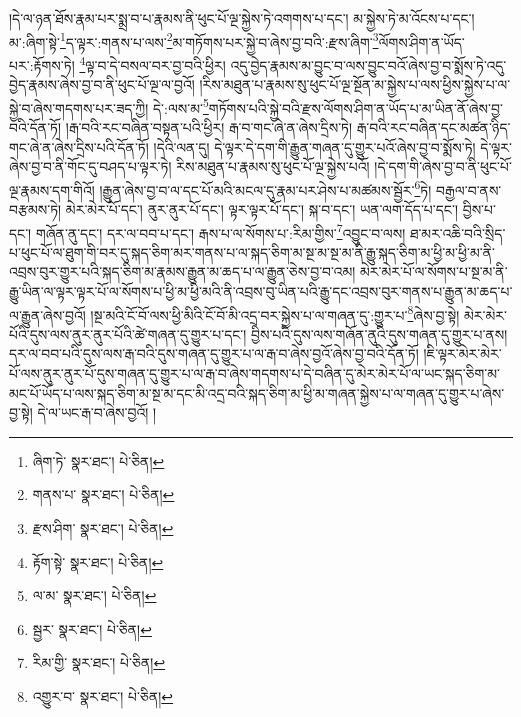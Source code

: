 །དེ་ལ་ཉན་ཐོས་རྣམ་པར་སྨྲ་བ་པ་རྣམས་ནི་ཕུང་པོ་ལྔ་སྐྱེས་ཏེ་འགགས་པ་དང་། མ་སྐྱེས་ཏེ་མ་འོངས་པ་དང་། མ་:ཞིག་སྟེ་\footnote{ཞིག་ཏེ་  སྣར་ཐང་།  པེ་ཅིན། }ད་ལྟར་:གནས་པ་ལས་\footnote{གནས་པ་  སྣར་ཐང་།  པེ་ཅིན། }མ་གཏོགས་པར་སྐྱེ་བ་ཞེས་བྱ་བའི་:རྫས་ཞིག་\footnote{རྫས་ཤིག་  སྣར་ཐང་།  པེ་ཅིན། }ལོགས་ཤིག་ན་ཡོད་པར་:རྟོགས་ཏེ། \footnote{རྟོག་སྟེ་  སྣར་ཐང་།  པེ་ཅིན། }ལྟ་བ་དེ་བསལ་བར་བྱ་བའི་ཕྱིར། འདུ་བྱེད་རྣམས་མ་བྱུང་བ་ལས་བྱུང་བའོ་ཞེས་བྱ་བ་སྨོས་ཏེ་འདུ་བྱེད་རྣམས་ཞེས་བྱ་བ་ནི་ཕུང་པོ་ལྔ་ལ་བྱའོ། །རིས་མཐུན་པ་རྣམས་སུ་ཕུང་པོ་ལྔ་སྔོན་མ་སྐྱེས་པ་ལས་ཕྱིས་སྐྱེས་པ་ལ་སྐྱེ་བ་ཞེས་གདགས་པར་ཟད་ཀྱི། དེ་:ལས་མ་\footnote{ལ་མ་  སྣར་ཐང་།  པེ་ཅིན། }གཏོགས་པའི་སྐྱེ་བའི་རྫས་ལོགས་ཤིག་ན་ཡོད་པ་མ་ཡིན་ནོ་ཞེས་བྱ་བའི་དོན་ཏོ། །རྒ་བའི་རང་བཞིན་བསྟན་པའི་ཕྱིར། རྒ་བ་གང་ཞེ་ན་ཞེས་དྲིས་ཏེ། རྒ་བའི་རང་བཞིན་དང་མཚན་ཉིད་གང་ཞེ་ན་ཞེས་དྲིས་པའི་དོན་ཏོ། །དེའི་ལན་དུ། དེ་ལྟར་དེ་དག་གི་རྒྱུན་གཞན་དུ་གྱུར་པའོ་ཞེས་བྱ་བ་སྨོས་ཏེ། དེ་ལྟར་ཞེས་བྱ་བ་ནི་གོང་དུ་བཤད་པ་ལྟར་ཏེ། རིས་མཐུན་པ་རྣམས་སུ་ཕུང་པོ་ལྔ་སྐྱེས་པའོ། །དེ་དག་གི་ཞེས་བྱ་བ་ནི་ཕུང་པོ་ལྔ་རྣམས་དག་གིའོ། །རྒྱུན་ཞེས་བྱ་བ་ལ་དང་པོ་མའི་མངལ་དུ་རྣམ་པར་ཤེས་པ་མཚམས་སྦྱོར་\footnote{སྦྱར་  སྣར་ཐང་།  པེ་ཅིན། }ཏེ། བརྒྱལ་བ་ནས་བརྩམས་ཏེ། མེར་མེར་པོ་དང་། ནུར་ནུར་པོ་དང་། ལྟར་ལྟར་པོ་དང་། སྐ་བ་དང་། ཡན་ལག་དོད་པ་དང་། བྱིས་པ་དང་། གཞོན་ནུ་དང་། དར་ལ་བབ་པ་དང་། རྒས་པ་ལ་སོགས་པ་:རིམ་གྱིས་\footnote{རིམ་གྱི་  སྣར་ཐང་།  པེ་ཅིན། }འབྱུང་བ་ལས། ཐ་མར་འཆི་བའི་སྲིད་པ་ཕུང་པོ་ལ་ཐུག་གི་བར་དུ་སྐད་ཅིག་མར་གནས་པ་ལ་སྐད་ཅིག་མ་སྔ་མ་སྔ་མ་ནི་རྒྱུ་སྐད་ཅིག་མ་ཕྱི་མ་ཕྱི་མ་ནི་འབྲས་བུར་གྱུར་པའི་སྐད་ཅིག་མ་རྣམས་རྒྱུན་མ་ཆད་པ་ལ་རྒྱུན་ཅེས་བྱ་བ་འམ། མེར་མེར་པོ་ལ་སོགས་པ་སྔ་མ་ནི་རྒྱུ་ཡིན་ལ་ལྟར་ལྟར་པོ་ལ་སོགས་པ་ཕྱི་མ་ཕྱི་མའི་ནི་འབྲས་བུ་ཡིན་པའི་རྒྱུ་དང་འབྲས་བུར་གནས་པ་རྒྱུན་མ་ཆད་པ་ལ་རྒྱུན་ཞེས་བྱའོ། །སྔ་མའི་ངོ་བོ་ལས་ཕྱི་མིའི་ངོ་བོ་མི་འདྲ་བར་སྐྱེས་པ་ལ་གཞན་དུ་:གྱུར་པ་\footnote{འགྱུར་བ་  སྣར་ཐང་།  པེ་ཅིན། }ཞེས་བྱ་སྟེ། མེར་མེར་པོའི་དུས་ལས་ནུར་ནུར་པོའི་ཚེ་གཞན་དུ་གྱུར་པ་དང་། བྱིས་པའི་དུས་ལས་གཞོན་ནུའི་དུས་གཞན་དུ་གྱུར་པ་ནས། དར་ལ་བབ་པའི་དུས་ལས་རྒ་བའི་དུས་གཞན་དུ་གྱུར་པ་ལ་རྒ་བ་ཞེས་བྱའོ་ཞེས་བྱ་བའི་དོན་ཏོ། །ཇི་ལྟར་མེར་མེར་པོ་ལས་ནུར་ནུར་པོ་དུས་གཞན་དུ་གྱུར་པ་ལ་རྒ་བ་ཞེས་གདགས་པ་དེ་བཞིན་དུ་མེར་མེར་པོ་ལ་ཡང་སྐད་ཅིག་མ་མང་པོ་ཡོད་པ་ལས་སྐད་ཅིག་མ་སྔ་མ་དང་མི་འདྲ་བའི་སྐད་ཅིག་མ་ཕྱི་མ་གཞན་སྐྱེས་པ་ལ་གཞན་དུ་གྱུར་པ་ཞེས་བྱ་སྟེ། དེ་ལ་ཡང་རྒ་བ་ཞེས་བྱའོ། །
